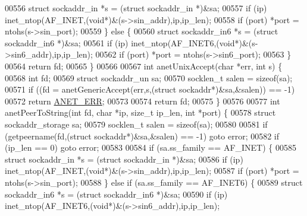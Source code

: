 \begin{DoxyCode}
{{{{{{{{{{{{{{{{{{{{{{{{{{00556         \textcolor{keyword}{struct} sockaddr\_in *s = (\textcolor{keyword}{struct} sockaddr\_in *)&sa;
00557         \textcolor{keywordflow}{if} (ip) inet\_ntop(AF\_INET,(\textcolor{keywordtype}{void}*)&(s->sin\_addr),ip,ip\_len);
00558         \textcolor{keywordflow}{if} (port) *port = ntohs(s->sin\_port);
00559     \} \textcolor{keywordflow}{else} \{
00560         \textcolor{keyword}{struct} sockaddr\_in6 *s = (\textcolor{keyword}{struct} sockaddr\_in6 *)&sa;
00561         \textcolor{keywordflow}{if} (ip) inet\_ntop(AF\_INET6,(\textcolor{keywordtype}{void}*)&(s->sin6\_addr),ip,ip\_len);
00562         \textcolor{keywordflow}{if} (port) *port = ntohs(s->sin6\_port);
00563     \}
00564     \textcolor{keywordflow}{return} fd;
00565 \}
00566 
00567 \textcolor{keywordtype}{int} anetUnixAccept(\textcolor{keywordtype}{char} *err, \textcolor{keywordtype}{int} s) \{
00568     \textcolor{keywordtype}{int} fd;
00569     \textcolor{keyword}{struct} sockaddr\_un sa;
00570     socklen\_t salen = \textcolor{keyword}{sizeof}(sa);
00571     \textcolor{keywordflow}{if} ((fd = anetGenericAccept(err,s,(\textcolor{keyword}{struct} sockaddr*)&sa,&salen)) == -1)
00572         \textcolor{keywordflow}{return} \hyperlink{anet_8h_a0697b7774a7e0f4ef141839fe93536fe}{ANET\_ERR};
00573 
00574     \textcolor{keywordflow}{return} fd;
00575 \}
00576 
00577 \textcolor{keywordtype}{int} anetPeerToString(\textcolor{keywordtype}{int} fd, \textcolor{keywordtype}{char} *ip, size\_t ip\_len, \textcolor{keywordtype}{int} *port) \{
00578     \textcolor{keyword}{struct} sockaddr\_storage sa;
00579     socklen\_t salen = \textcolor{keyword}{sizeof}(sa);
00580 
00581     \textcolor{keywordflow}{if} (getpeername(fd,(\textcolor{keyword}{struct} sockaddr*)&sa,&salen) == -1) \textcolor{keywordflow}{goto} error;
00582     \textcolor{keywordflow}{if} (ip\_len == 0) \textcolor{keywordflow}{goto} error;
00583 
00584     \textcolor{keywordflow}{if} (sa.ss\_family == AF\_INET) \{
00585         \textcolor{keyword}{struct} sockaddr\_in *s = (\textcolor{keyword}{struct} sockaddr\_in *)&sa;
00586         \textcolor{keywordflow}{if} (ip) inet\_ntop(AF\_INET,(\textcolor{keywordtype}{void}*)&(s->sin\_addr),ip,ip\_len);
00587         \textcolor{keywordflow}{if} (port) *port = ntohs(s->sin\_port);
00588     \} \textcolor{keywordflow}{else} \textcolor{keywordflow}{if} (sa.ss\_family == AF\_INET6) \{
00589         \textcolor{keyword}{struct} sockaddr\_in6 *s = (\textcolor{keyword}{struct} sockaddr\_in6 *)&sa;
00590         \textcolor{keywordflow}{if} (ip) inet\_ntop(AF\_INET6,(\textcolor{keywordtype}{void}*)&(s->sin6\_addr),ip,ip\_len);
}}}}}}}}}}}}}}}}}}}}}}}}}}
\end{DoxyCode}
